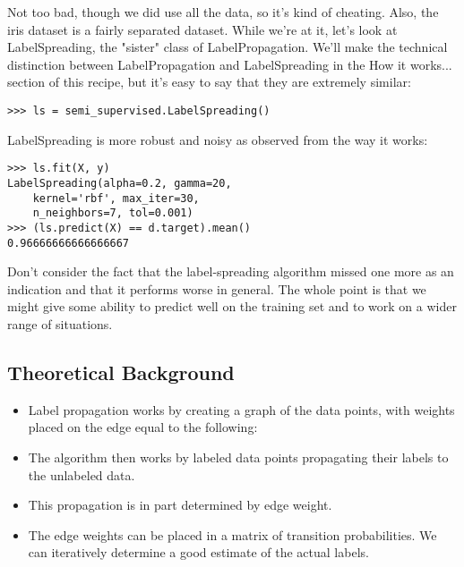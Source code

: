 \documentclass[SKL-MASTER.tex]{subfiles}
\begin{document}
Not too bad, though we did use all the data, so it's kind of cheating. Also, the iris dataset is
a fairly separated dataset.
While we're at it, let's look at LabelSpreading, the "sister" class of LabelPropagation.
We'll make the technical distinction between LabelPropagation and LabelSpreading in
the How it works... section of this recipe, but it's easy to say that they are extremely similar:
\begin{framed}
	\begin{verbatim}
>>> ls = semi_supervised.LabelSpreading()
\end{verbatim}
\end{framed}
LabelSpreading is more robust and noisy as observed from the way it works:
\begin{framed}
\begin{verbatim}
>>> ls.fit(X, y)
LabelSpreading(alpha=0.2, gamma=20, 
    kernel='rbf', max_iter=30,
    n_neighbors=7, tol=0.001)
>>> (ls.predict(X) == d.target).mean()
0.96666666666666667
\end{verbatim}
\end{framed}
Don't consider the fact that the label-spreading algorithm missed one more as an indication
and that it performs worse in general. The whole point is that we might give some ability to
predict well on the training set and to work on a wider range of situations.
\subsection{Theoretical Background}
\begin{itemize}
\item Label propagation works by creating a graph of the data points, with weights placed on the
edge equal to the following:
\item The algorithm then works by labeled data points propagating their labels to the unlabeled data.
\item This propagation is in part determined by edge weight.
\item The edge weights can be placed in a matrix of transition probabilities. We can iteratively
determine a good estimate of the actual labels.
\end{itemize}
\end{document}
